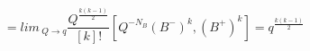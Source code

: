 \begin{equation}
=lim\, _{Q\rightarrow q}\frac{Q^{\frac{k(k-1)}2}}{[k]!}[%
Q^{-N_B}(B^{-})^k,(B^{+})^k]=q^{\frac{k(k-1)}2}
\end{equation}

